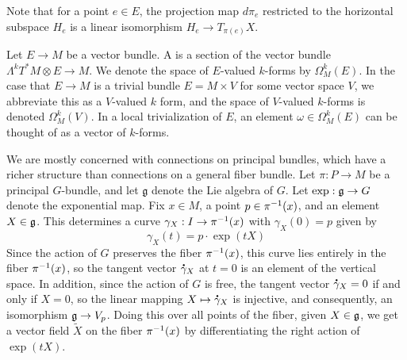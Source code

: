 %
Note that for a point $e \in E$, the projection map $d\pi_e$ restricted to
the horizontal subspace $H_e$ is a linear isomorphism $H_e \to T_{\pi(e)}X$.
%
\begin{defn}
Let $E \to M$ be a vector bundle. A  is a section of
the vector bundle $\Lambda^kT^*M \otimes E \to M$. We denote the space of
$E$-valued $k$-forms by $\Omega_M^k(E)$. In the case that $E \to M$ is a
trivial bundle $E = M \times V$ for some vector space $V$, we abbreviate
this as a $V$-valued $k$ form, and the space of $V$-valued $k$-forms is denoted
$\Omega_M^k(V)$. In a local trivialization of $E$, an element
$\omega \in \Omega^k_M(E)$ can be thought of as a vector of $k$-forms.
\end{defn}
%
We are mostly concerned with connections on principal bundles, which have a
richer structure than connections on a general fiber bundle. Let $\pi : P \to M$
be a principal $G$-bundle, and let $\mathfrak{g}$ denote the Lie algebra of $G$.
Let $\exp : \mathfrak{g} \to G$ denote the exponential map. Fix $x \in M$, a point
$p \in \pi^{-1}(x)$, and an element $X \in \mathfrak{g}$. This determines a curve
$\gamma_X : I \to \pi^{-1}(x)$ with $\gamma_X(0) = p$ given by
\[
\gamma_X(t) = p \cdot \exp(tX)
\]
Since the action of $G$ preserves the fiber $\pi^{-1}(x)$, this curve lies
entirely in the fiber $\pi^{-1}(x)$, so the tangent vector $\accentset{\mbox{\large\bfseries .}}{\gamma}_X$
at $t = 0$ is an element of the vertical space. In addition, since the
action of $G$ is free, the tangent vector $\accentset{\mbox{\large\bfseries .}}{\gamma}_X = 0$ if and only if
$X = 0$, so the linear mapping $X \mapsto \accentset{\mbox{\large\bfseries .}}{\gamma}_X$ is injective, and
consequently, an isomorphism $\mathfrak{g} \to V_p$. Doing this over all points of the
fiber, given $X \in \mathfrak{g}$, we get a vector field $\tilde{X}$
on the fiber $\pi^{-1}(x)$ by differentiating the right action of $\exp(tX)$.

